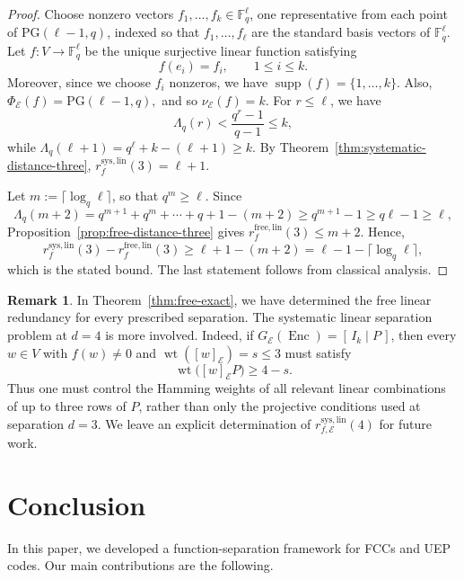 \documentclass[a4paper,12pt]{article}
\theoremstyle{plain}
\theoremstyle{definition}
\newtheorem{remark}[lemma]{Remark}
\newcommand{\F}{\mathbb F}
\newcommand{\wt}{\operatorname{wt}}
\newcommand{\Enc}{\operatorname{Enc}}
\begin{document}
\begin{proof}
Choose nonzero vectors $f_1,\dots,f_k\in\F_q^\ell$, one
representative from each point of $\mathrm{PG}(\ell-1,q)$, indexed
so that $f_1,\dots,f_\ell$ are the standard basis vectors of
$\F_q^\ell$. Let $f\colon V\to\F_q^\ell$ be the unique surjective linear
function satisfying
\[
f(e_i)=f_i,\qquad 1\leq i\leq k.
\]
Moreover, since we choose $f_i$ nonzeros, 
we have 
$\operatorname{supp}(f)=\{1,\dots,k\}.$
Also, $\Phi_{\mathcal E}(f)=\mathrm{PG}(\ell-1,q),$
and so $\nu_{\mathcal E}(f)=k.$
For $r\leq\ell$, we have
\[
\Lambda_q(r)<\frac{q^r-1}{q-1}\leq k,
\]
while $\Lambda_q(\ell+1)=q^\ell+k-(\ell+1)\geq k.$
By Theorem~\ref{thm:systematic-distance-three},  $r_f^{\mathrm{sys,lin}}(3)=\ell+1$.

Let $m:=\lceil\log_q\ell\rceil$, so that $q^m\geq\ell$. Since
\[
\Lambda_q(m+2) =
q^{m+1}+q^m+\cdots+q+1-(m+2)
\geq q^{m+1}-1 \geq q\ell-1 \geq \ell,
\]
Proposition~\ref{prop:free-distance-three} gives
$r_f^{\mathrm{free,lin}}(3)\leq m+2$.
Hence,
\[
r_f^{\mathrm{sys,lin}}(3)-r_f^{\mathrm{free,lin}}(3)
\geq
\ell+1-(m+2)= \ell-1-\lceil\log_q\ell\rceil,
\]
which is the stated bound. The last statement follows from classical analysis.
\end{proof}
\begin{remark}
\label{rem:distance-four}
In Theorem~\ref{thm:free-exact}, we have determined the free linear
redundancy for every prescribed separation. The  systematic linear separation problem at $d=4$ is more involved. Indeed, if
$G_{\mathcal E}(\Enc)=[\,I_k\mid P\,]$, then every $w\in V$ with
$f(w)\neq0$ and
$\wt([w]_{\mathcal E})=s\leq3$ must satisfy
\[
\wt\bigl([w]_{\mathcal E}P\bigr)\geq4-s.
\]
Thus one must control the Hamming weights of all relevant linear
combinations of up to three rows of $P$, rather than only the
projective conditions used at separation $d=3$. We leave an explicit
determination of
$r_{f,\mathcal E}^{\mathrm{sys,lin}}(4)$ for future work.
\end{remark} 

\section{Conclusion}\label{sec:conclusion}

In this paper, we developed a function-separation framework for FCCs and UEP codes. Our main contributions are the following.
\end{document}
